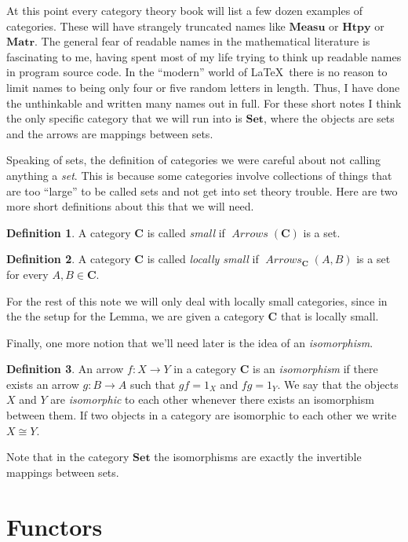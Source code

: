 \documentclass[12pt]{article}
\theoremstyle{definition}
\theoremstyle{definition}
\newtheorem{defn}{Definition}[]
\theoremstyle{definition}
\numberwithin{equation}{section}
\newcommand{\cat}[1]{\mathbf{#1}}      %
\newcommand{\CC}{\cat{C}}
\DeclareMathOperator{\Arrows}{\mathit{Arrows}}
\newcommand{\iso}{\cong}                %
\def\ni{\goodbreak\noindent}
\begin{document}
\goodbreak
At this point every category theory book will list a few dozen examples of categories. 
These will have strangely truncated names like
$\cat{Measu}$ or $\cat{Htpy}$ or $\cat{Matr}$.
{The general fear of readable names in the mathematical literature is fascinating
to me, having spent most of my life trying to think up readable names in program source
code. In the ``modern'' world of \LaTeX\ there is no reason to limit names to being only four
or five random letters in length. Thus, I have done the unthinkable and written many names
out in full.}
For these short notes I think the only specific
category that we will run into is $\cat{Set}$, where the objects are sets and the arrows
are mappings between sets.

Speaking of sets, the definition of categories we were careful about not calling anything
a {\it set}. This is because some categories involve collections of things that are too
``large'' to be called sets and not get into set theory trouble. Here are two more short
definitions about this that we will need.

\begin{defn}
A category $\CC$ is called {\it small} if $\Arrows(\CC)$ is a set.
\end{defn}

\begin{defn}
A category $\CC$ is called {\it locally small} if $\Arrows_{\CC}(A,B)$ is a set for every
$A, B \in \CC$. \end{defn}%
\ni
For the rest of this note we will only deal with locally small categories, since in the
the setup for the Lemma, we are given a category $\CC$ that is locally small.

Finally, one more notion that we'll need later is the idea of an {\it isomorphism}.

\begin{defn}
An arrow $f: X \to Y$ in a category $\CC$ is an {\it isomorphism} if there exists an arrow
$g: B \to A$ such that $gf = 1_X$ and $fg = 1_Y$. We say that the objects $X$ and $Y$ are
{\it isomorphic} to each other whenever there exists an isomorphism between them. If two
objects in a category are isomorphic to each other we write $X \iso Y$.
\end{defn}
\ni
Note that in the category $\cat{Set}$ the isomorphisms are exactly the invertible mappings
between sets.

\section{Functors}
\end{document}
